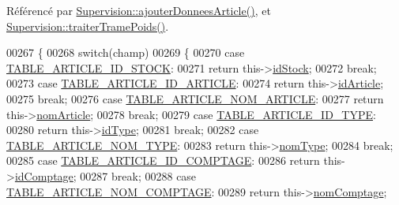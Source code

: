 Référencé par \hyperlink{_supervision_8cpp_source_l00508}{Supervision\+::ajouter\+Donnees\+Article()}, et \hyperlink{_supervision_8cpp_source_l00370}{Supervision\+::traiter\+Trame\+Poids()}.


\begin{DoxyCode}
00267 \{
00268     \textcolor{keywordflow}{switch}(champ)
00269     \{
00270         \textcolor{keywordflow}{case} \hyperlink{_article_8h_a159354683cfd6e1b578172fbe6490ab6acfb8962aaa35363f43d27a9f6f1ae265}{TABLE\_ARTICLE\_ID\_STOCK}:
00271             \textcolor{keywordflow}{return} this->\hyperlink{class_article_afb7785930598d5fbdafb707acdd3eec1}{idStock};
00272             \textcolor{keywordflow}{break};
00273         \textcolor{keywordflow}{case} \hyperlink{_article_8h_a159354683cfd6e1b578172fbe6490ab6a9282e68cff8aecde470ad5004f0e5ebb}{TABLE\_ARTICLE\_ID\_ARTICLE}:
00274             \textcolor{keywordflow}{return} this->\hyperlink{class_article_a9f2f7a04139f26accec145066a5aacae}{idArticle};
00275             \textcolor{keywordflow}{break};
00276         \textcolor{keywordflow}{case} \hyperlink{_article_8h_a159354683cfd6e1b578172fbe6490ab6a7a309a358c54f9ea482a222d0cb4d135}{TABLE\_ARTICLE\_NOM\_ARTICLE}:
00277             \textcolor{keywordflow}{return} this->\hyperlink{class_article_a0ba6c08f7dd54e4b7caf673ecd6b41a6}{nomArticle};
00278             \textcolor{keywordflow}{break};
00279         \textcolor{keywordflow}{case} \hyperlink{_article_8h_a159354683cfd6e1b578172fbe6490ab6a57d25aaddbe360d849497b01b865599c}{TABLE\_ARTICLE\_ID\_TYPE}:
00280             \textcolor{keywordflow}{return} this->\hyperlink{class_article_a1586203d0eb334a3298ca719f924083d}{idType};
00281             \textcolor{keywordflow}{break};
00282         \textcolor{keywordflow}{case} \hyperlink{_article_8h_a159354683cfd6e1b578172fbe6490ab6a7644b9669e82ebdf66baef0dff84f46c}{TABLE\_ARTICLE\_NOM\_TYPE}:
00283             \textcolor{keywordflow}{return} this->\hyperlink{class_article_a06489a7445495277e44c7179b7cf8bbc}{nomType};
00284             \textcolor{keywordflow}{break};
00285         \textcolor{keywordflow}{case} \hyperlink{_article_8h_a159354683cfd6e1b578172fbe6490ab6ad0cf55fa9bf7bc4a120c207ba2712860}{TABLE\_ARTICLE\_ID\_COMPTAGE}:
00286             \textcolor{keywordflow}{return} this->\hyperlink{class_article_adc8cef4c963c0fcc6d486dab4bd60e17}{idComptage};
00287             \textcolor{keywordflow}{break};
00288         \textcolor{keywordflow}{case} \hyperlink{_article_8h_a159354683cfd6e1b578172fbe6490ab6a525a8c35de3d4035d3db311a090a0509}{TABLE\_ARTICLE\_NOM\_COMPTAGE}:
00289             \textcolor{keywordflow}{return} this->\hyperlink{class_article_a1953a03d4505797952054141dbb2e327}{nomComptage};

\end{DoxyCode}
